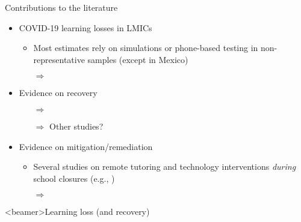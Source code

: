 \documentclass[aspectratio=169,numbering=none]{beamer}
\begin{document}
\begin{frame}[plain]{Contributions to the literature}
\begin{itemize}
\vfill \item COVID-19 learning losses in LMICs \cite{patrinos2022analysis,moscoviz2022learning}
\begin{itemize}
\vfill \item Most estimates rely on simulations or phone-based testing in non-representative samples (except  in Mexico)
\vfill \item[$\Rightarrow$] \textbf{\color{blue}{In-person testing in a near-representative sample, IRT-linked measurement}}
\end{itemize}
\vfill \item Evidence on recovery
\begin{itemize}
\vfill \item[$\Rightarrow$] \textbf{\color{blue}{Measure system-wide catch-up in LMICs}} 
\vfill \item[$\Rightarrow$] Other studies? \cite{lichand2022lasting}
\end{itemize}
\vfill \item Evidence on mitigation/remediation
\begin{itemize}
\vfill \item Several studies on remote tutoring and technology interventions \textit{during} school closures (e.g., )
\vfill \item[$\Rightarrow$] \textbf{\color{blue}{Evidence on at-scale program to remediate learning losses upon school opening}}
\end{itemize}
\end{itemize}
\end{frame}


\begin{frame}<beamer>{Learning loss (and recovery)}
        \tableofcontents
 \end{frame}
      
\end{document}
